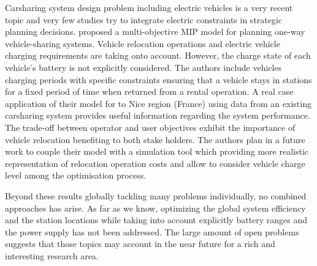 \begin{bibunit}[ieeetr]
\medskip
Carsharing system design problem including electric vehicles is a very recent topic and very few studies try to integrate electric constraints in strategic planning decisions.
\cite{boyaci_optimization_2015} proposed a multi-objective MIP model for planning one-way vehicle-sharing systems.
Vehicle relocation operations and electric vehicle charging requirements are taking onto account.
However, the charge state of each vehicle's battery is not explicitly considered.
The authors include vehicles charging periods with specific constraints ensuring that a vehicle stays in stations for a fixed period of time when returned from a rental operation.
A real case application of their model for to Nice region (France) using data from an existing carsharing system provides useful information regarding the system performance.
The trade-off between operator and user objectives exhibit the importance of vehicle relocation benefiting to both stake holders.
The authors plan in a future work to couple their model with a simulation tool which providing more realistic representation of relocation operation costs and allow to consider vehicle charge level among the optimisation process.


\medskip
Beyond these results globally tackling many problems individually, no combined approaches has arise. 
As far as we know, optimizing the global system efficiency and the station locations while taking into account explicitly battery ranges and the power supply has not been addressed.
The large amount of open problems suggests that those topics may account in the near future for a rich and interesting  research area.





\end{bibunit}
